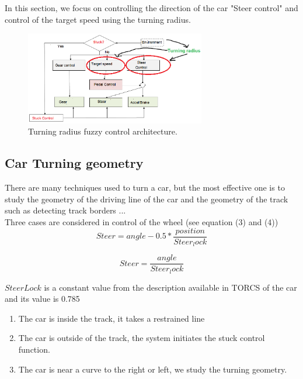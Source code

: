 \documentclass{llncs}
\begin{document}
In this section, we focus on controlling the direction of the car "Steer control" and control of the target speed using the turning radius.
\begin{figure}[h!]
	
	\centering
	\includegraphics[width=0.7\textwidth]{fig/steercible3.png}
	\begin{minipage}{10cm}
		\centering
		\caption{\footnotesize Turning radius fuzzy control architecture.}
		\label{fig45}
	\end{minipage} 
\end{figure}
\subsection{Car Turning geometry }	
There are many techniques used to turn a car, but the most effective one is to study the geometry of the driving line of the car and the geometry of the track such as detecting track borders ... \\

Three cases are considered in control of the wheel (see equation (3) and (4)) \\

\begin{equation}
Steer =  angle - 0.5 *\frac{position }{Steer_lock}		
\end{equation}

\begin{equation}
Steer =  \frac{angle }{Steer_lock}	
\end{equation}

$SteerLock $ is a constant value  from the description available in TORCS of the car  and its value is 0.785		
\begin{enumerate}
	\item  The car is inside the track, it takes a restrained line \\
	\item  The car is outside of the track, the system initiates the stuck control function.\\
	\item  The car is near a curve to the right or left, we study the turning geometry. \\	
\end{enumerate}	
\end{document}
